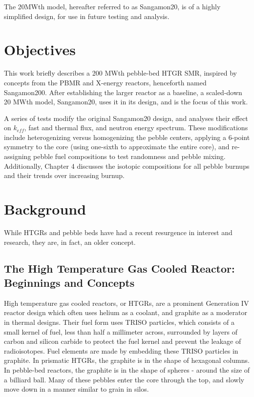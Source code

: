 The 20MWth model, hereafter referred to as Sangamon20, is of a highly simplified design, for use in future testing and analysis.



\section{Objectives}

This work briefly describes a 200 MWth pebble-bed HTGR SMR, inspired by concepts from the PBMR and X-energy reactors, henceforth named Sangamon200.  After establishing the larger reactor as a baseline, a scaled-down 20 MWth model, Sangamon20, uses it in its design, and is the focus of this work.

A series of tests modify the original Sangamon20 design, and analyses their effect on $k_{eff}$, fast and thermal flux, and neutron energy spectrum.  These modifications include heterogenizing versus homogenizing the pebble centers, applying a 6-point symmetry to the core (using one-sixth to approximate the entire core), and re-assigning pebble fuel compositions to test randomness and pebble mixing.  Additionally, Chapter 4 discusses the isotopic compositions for all pebble burnups and their trends over increasing burnup.

\section{Background}

While HTGRs and pebble beds have had a recent resurgence in interest and research, they are, in fact, an older concept.

\subsection{The High Temperature Gas Cooled Reactor: Beginnings and Concepts}

High temperature gas cooled reactors, or HTGRs, are a prominent Generation IV reactor design which often uses helium as a coolant, and graphite as a moderator in thermal designs.  Their fuel form uses TRISO particles, which consists of a small kernel of fuel, less than half a millimeter across, surrounded by layers of carbon and silicon carbide to protect the fuel kernel and prevent the leakage of radioisotopes.  Fuel elements are made by embedding these TRISO particles in graphite.  In prismatic HTGRs, the graphite is in the shape of hexagonal columns.  In pebble-bed reactors, the graphite is in the shape of spheres - around the size of a billiard ball.  Many of these pebbles enter the core through the top, and slowly move down in a manner similar to grain in silos.

